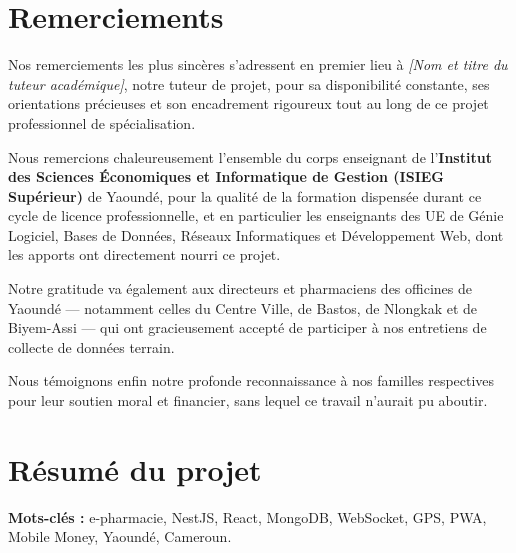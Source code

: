 \documentclass[12pt,a4paper,oneside]{report}
\begin{document}
\chapter*{Remerciements}
\thispagestyle{plain}

Nos remerciements les plus sincères s'adressent en premier lieu à \textit{[Nom et titre du tuteur académique]}, notre tuteur de projet, pour sa disponibilité constante, ses orientations précieuses et son encadrement rigoureux tout au long de ce projet professionnel de spécialisation.

Nous remercions chaleureusement l'ensemble du corps enseignant de l'\textbf{Institut des Sciences Économiques et Informatique de Gestion (ISIEG Supérieur)} de Yaoundé, pour la qualité de la formation dispensée durant ce cycle de licence professionnelle, et en particulier les enseignants des UE de Génie Logiciel, Bases de Données, Réseaux Informatiques et Développement Web, dont les apports ont directement nourri ce projet.

Notre gratitude va également aux directeurs et pharmaciens des officines de Yaoundé — notamment celles du Centre Ville, de Bastos, de Nlongkak et de Biyem-Assi — qui ont gracieusement accepté de participer à nos entretiens de collecte de données terrain.

Nous témoignons enfin notre profonde reconnaissance à nos familles respectives pour leur soutien moral et financier, sans lequel ce travail n'aurait pu aboutir.
\clearpage

\tableofcontents
\clearpage

\chapter*{Résumé du projet}
\thispagestyle{plain}

\textbf{Mots-clés :} e-pharmacie, NestJS, React, MongoDB, WebSocket, GPS, PWA, Mobile Money, Yaoundé, Cameroun.

\vspace{0.4cm}
\end{document}
